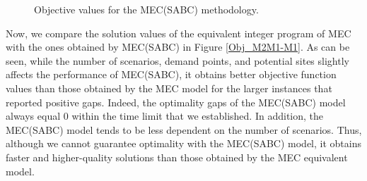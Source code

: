 \begin{figure}[H]
\hspace{0.4cm}%
\vspace{0.4cm}
\caption{Objective values for the MEC(SABC) methodology.}
\label{Obj_M2M1}
\end{figure}

Now, we compare the solution values of the equivalent integer program of MEC with the ones obtained by MEC(SABC) in Figure \ref{Obj_M2M1-M1}. As can be seen, while the number of scenarios, demand points, and potential sites slightly affects the performance of MEC(SABC), it obtains better objective function values than those obtained by the MEC model for the larger instances that reported positive gaps. Indeed, the optimality gaps of the MEC(SABC) model always equal 0 within the time limit that we established. In addition, the MEC(SABC) model tends to be less dependent on the number of scenarios. Thus, although we cannot guarantee optimality with the MEC(SABC) model, it obtains faster and higher-quality solutions than those obtained by the MEC equivalent model. 


